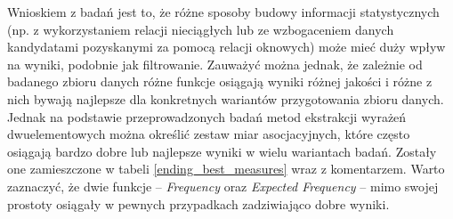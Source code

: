 \par
Wnioskiem z badań jest to, że różne sposoby budowy informacji statystycznych (np. z wykorzystaniem relacji nieciągłych lub ze wzbogaceniem danych kandydatami pozyskanymi za pomocą relacji oknowych) może mieć duży wpływ na wyniki, podobnie jak filtrowanie.
Zauważyć można jednak, że zależnie od badanego zbioru danych różne funkcje osiągają wyniki różnej jakości i różne z nich bywają najlepsze dla konkretnych wariantów przygotowania zbioru danych.
Jednak na podstawie przeprowadzonych badań metod ekstrakcji wyrażeń dwuelementowych można określić zestaw miar asocjacyjnych, które często osiągają bardzo dobre lub najlepsze wyniki w wielu wariantach badań.
Zostały one zamieszczone w tabeli \ref{ending_best_measures} wraz z komentarzem.
Warto zaznaczyć, że dwie funkcje -- \emph{Frequency} oraz \emph{Expected Frequency} -- mimo swojej prostoty osiągały w pewnych przypadkach zadziwiająco dobre wyniki.


